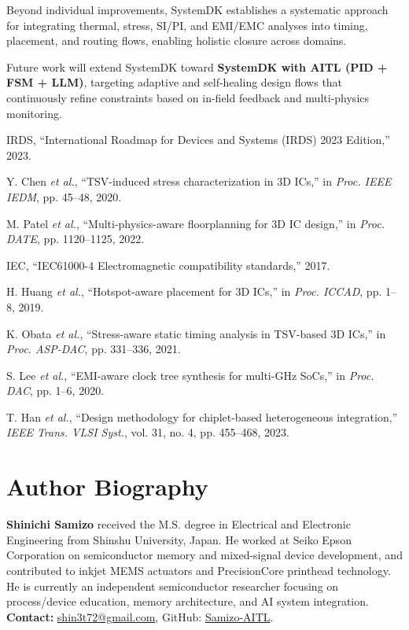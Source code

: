 \documentclass[conference]{IEEEtran}
\begin{document}
Beyond individual improvements, SystemDK establishes a systematic approach
for integrating thermal, stress, SI/PI, and EMI/EMC analyses into timing,
placement, and routing flows, enabling holistic closure across domains.

Future work will extend SystemDK toward \textbf{SystemDK with AITL
(PID + FSM + LLM)}, targeting adaptive and self-healing design flows that
continuously refine constraints based on in-field feedback and
multi-physics monitoring.

\begin{thebibliography}{00}

\IEEEtriggercmd{\enlargethispage{-2.5cm}}

IRDS, ``International Roadmap for Devices and Systems (IRDS) 2023 Edition,'' 2023.

Y. Chen \textit{et al.}, ``TSV-induced stress characterization in 3D ICs,'' in \textit{Proc. IEEE IEDM}, pp. 45--48, 2020.

M. Patel \textit{et al.}, ``Multi-physics-aware floorplanning for 3D IC design,'' in \textit{Proc. DATE}, pp. 1120--1125, 2022.

IEC, ``IEC61000-4 Electromagnetic compatibility standards,'' 2017.

H. Huang \textit{et al.}, ``Hotspot-aware placement for 3D ICs,'' in \textit{Proc. ICCAD}, pp. 1--8, 2019.

K. Obata \textit{et al.}, ``Stress-aware static timing analysis in TSV-based 3D ICs,'' in \textit{Proc. ASP-DAC}, pp. 331--336, 2021.

S. Lee \textit{et al.}, ``EMI-aware clock tree synthesis for multi-GHz SoCs,'' in \textit{Proc. DAC}, pp. 1--6, 2020.

T. Han \textit{et al.}, ``Design methodology for chiplet-based heterogeneous integration,'' \textit{IEEE Trans. VLSI Syst.}, vol. 31, no. 4, pp. 455--468, 2023.

\end{thebibliography}

\section*{Author Biography}
\noindent\textbf{Shinichi Samizo}
received the M.S. degree in Electrical and Electronic Engineering from Shinshu University, Japan.
He worked at Seiko Epson Corporation on semiconductor memory and mixed-signal device development, and contributed to inkjet MEMS actuators and PrecisionCore printhead technology.
He is currently an independent semiconductor researcher focusing on process/device education, memory architecture, and AI system integration.\\
\textbf{Contact:} \href{mailto:shin3t72@gmail.com}{shin3t72@gmail.com}, GitHub: \href{https://github.com/Samizo-AITL}{Samizo-AITL}.
\end{document}
